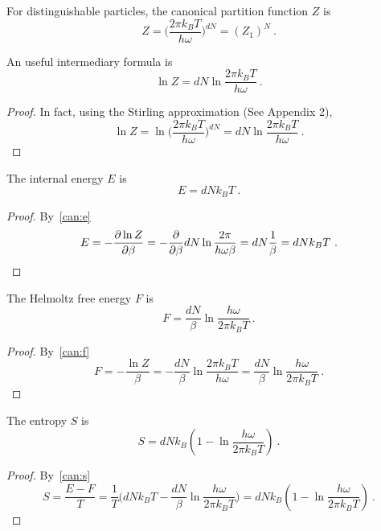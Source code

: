     For distinguishable particles, the canonical partition function $Z$ is 
    \begin{equation*}
        Z = \Big (\frac{2 \pi k_B T}{h \omega} \Big )^{dN} = (Z_1)^N ~.
    \end{equation*}

    An useful intermediary formula is 
    \begin{equation*}
        \ln Z = d N \ln \frac{2 \pi k_B T}{h \omega} ~.
    \end{equation*}
    \begin{proof}
        In fact, using the Stirling approximation (See Appendix 2),
        \begin{equation*}
            \ln Z = \ln \Big (\frac{2 \pi k_B T}{h \omega} \Big )^{dN} = d N \ln \frac{2 \pi k_B T}{h \omega} ~.
        \end{equation*}
    \end{proof}
    
    The internal energy $E$ is 
    \begin{equation*}
        E = d N k_B T ~.
    \end{equation*}
    \begin{proof}
        By~\eqref{can:e}
        \begin{equation*}
            E = - \frac{\partial\ln Z}{\partial\beta} = - \frac{\partial}{\partial\beta} d N \ln \frac{2 \pi}{h \omega \beta} = d N \frac{1}{\beta} = d N k_B T ~.
        \end{equation*}
    \end{proof}
    
    The Helmoltz free energy $F$ is 
    \begin{equation*}
        F = \frac{dN}{\beta} \ln \frac{h \omega}{2 \pi k_B T} ~.
    \end{equation*}
    \begin{proof}
        By~\eqref{can:f}
        \begin{equation*}
            F = - \frac{\ln Z}{\beta} = - \frac{dN}{\beta} \ln \frac{2 \pi k_B T}{h \omega} = \frac{dN}{\beta} \ln \frac{h \omega}{2 \pi k_B T} ~.
        \end{equation*}
    \end{proof}
    
    The entropy $S$ is 
    \begin{equation*}
        S = d N k_B (1 - \ln \frac{h \omega}{2 \pi k_B T}) ~.
    \end{equation*}
    \begin{proof}
        By~\eqref{can:s}
        \begin{equation*}
            S = \frac{E - F}{T} = \frac{1}{T} \Big ( d N k_B T - \frac{dN}{\beta} \ln \frac{h \omega}{2 \pi k_B T} \Big ) = d N k_B (1 - \ln \frac{h \omega}{2 \pi k_B T}) ~.
        \end{equation*}
    \end{proof}

